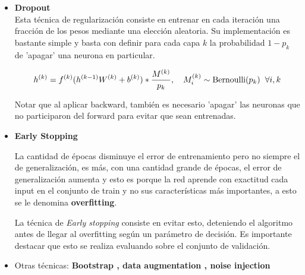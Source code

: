 \documentclass[9pt]{beamer}
\begin{document}
\begin{frame}
\begin{itemize}
  \item \textbf{Dropout} \\ 

  Esta técnica de regularización consiste en entrenar en cada iteración una fracción de los pesos mediante una elección aleatoria. Su implementación es bastante simple y basta con definir para cada capa $k$ la probabilidad $1-p_k$ de 'apagar' una neurona en particular. \pause

    \[
    h^{(k)} = f^{(k)}(h^{(k-1)}W^{(k)} + b^{(k)}) *  \frac{M^{(k)}}{p_k}, \quad M^{(k)}_i \sim \text{Bernoulli}(p_k) \hspace{0.2cm} \forall i,k
    \]

  Notar que al aplicar backward, también es necesario 'apagar' las neuronas que no participaron del forward para evitar que sean entrenadas. \pause

  \item \textbf{Early Stopping} \pause

  La cantidad de épocas disminuye el error de entrenamiento pero no siempre el de generalización, es más, con una cantidad grande de épocas, el error de generalización aumenta y esto es porque la red aprende con exactitud cada input en el conjunto de train y no sus características más importantes, a esto se le denomina \textbf{overfitting}. \\ \pause

  La técnica de \textit{Early stopping} consiste en evitar esto, deteniendo el algoritmo antes de llegar al overfitting según un parámetro de decisión. Es importante destacar que esto se realiza evaluando sobre el conjunto de validación. \pause

  \item Otras técnicas: \textbf{Bootstrap , data augmentation , noise injection}


\end{itemize}


\end{frame}

\begin{frame}
  \titlepage
\end{frame}






%
\end{document}
